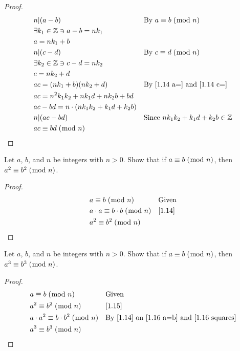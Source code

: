 \documentclass[../main.tex]{subfiles}
\begin{document}
\begin{proof}
\begin{align}
    &n|(a-b) && \mbox{By $a \equiv b \; (\bmod \; n)$} \\
    &\exists k_1 \in \mathbb{Z} \ni a - b = nk_1 \\
    \label{1.14 a=}
    &a = nk_1 + b \\
    &n|(c-d) && \mbox{By $c \equiv d \; (\bmod \; n)$} \\
    &\exists k_2 \in \mathbb{Z} \ni c - d = nk_2 \\
    \label{1.14 c=}
    &c = nk_2 + d \\
    &ac = (nk_1 + b)(nk_2 + d) && \mbox{By \eqref{1.14 a=} and \eqref{1.14 c=}}\\
    &ac = n^2k_1k_2 + nk_1d + nk_2b + bd \\
    &ac - bd = n \cdot (nk_1k_2 + k_1d + k_2b) \\
    &n|(ac - bd) && \mbox{Since $nk_1k_2 + k_1d + k_2b \in \mathbb{Z}$}\\
    &ac \equiv bd \; (\bmod \; n) && \qedhere
\end{align}
\end{proof}



\begin{ex} \label{1.15}
Let $a$, $b$, and $n$ be integers with $n > 0$. Show that if $a \equiv b \; (\bmod \; n)$, then $a^2 \equiv b^2 \; (\bmod \; n)$.
\end{ex}

\begin{proof}
\begin{align}
    &a \equiv b \; (\bmod \; n) && \mbox{Given} \\
    &a \cdot a \equiv b \cdot b \; (\bmod \; n) && \mbox{\ref{1.14}} \\
    &a^2 \equiv b^2 \; (\bmod \; n) && \qedhere
\end{align}
\end{proof}



\begin{ex} \label{1.16}
Let $a$, $b$, and $n$ be integers with $n > 0$. Show that if $a \equiv b \; (\bmod \; n)$, then $a^3 \equiv b^3 \; (\bmod \; n)$.
\end{ex}

\begin{proof}
\begin{align}
    \label{1.16 a=b}
    &a \equiv b \; (\bmod \; n) && \mbox{Given} \\
    \label{1.16 squares}
    &a^2 \equiv b^2 \; (\bmod \; n) && \mbox{\ref{1.15}} \\
    &a \cdot a^2 \equiv b \cdot b^2 \; (\bmod \; n) && \mbox{By \ref{1.14} on \eqref{1.16 a=b} and \eqref{1.16 squares}} \\
    &a^3 \equiv b^3 \; (\bmod \; n) && \qedhere
\end{align}
\end{proof}
\end{document}
